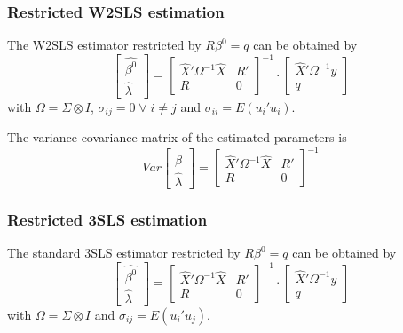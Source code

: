 \documentclass[article]{jss}
\begin{document}
\subsubsection{Restricted W2SLS estimation}

The W2SLS estimator restricted by $R \beta^0 = q$ can be obtained by
\begin{equation}
   \left[ \begin{array}{c}
      \widehat{\beta^0} \\ \widehat{\lambda}
   \end{array} \right]
   =
   \left[ \begin{array}{cc}
      \widehat{X}' \Omega^{-1} \widehat{X} & R' \\ 
      R & 0
   \end{array} \right]^{-1}
   \cdot
   \left[ \begin{array}{c}
      \widehat{X}' \Omega^{-1} y \\ q 
   \end{array} \right]
\end{equation}
with $\Omega = \Sigma \otimes I$, 
$\sigma_{ij} = 0 \; \forall \; i \neq j$ and
$\sigma_{ii} = E \left( u_i' u_i \right)$.

The variance-covariance matrix of the estimated parameters is
\begin{equation}
   Var 
   \left[ \begin{array}{c}
      \widehat{\beta} \\ \widehat{\lambda}
   \end{array} \right] 
   = 
   \left[ \begin{array}{cc}
      \widehat{X}' \Omega^{-1} \widehat{X} & R' \\ 
      R & 0
   \end{array} \right]^{-1}
\end{equation}


\subsubsection{Restricted 3SLS estimation}

The standard 3SLS estimator restricted by $R \beta^0 = q$ can be obtained by
\begin{equation}
   \left[ \begin{array}{c}
      \widehat{\beta^0} \\ \widehat{\lambda}
   \end{array} \right]
   =
   \left[ \begin{array}{cc}
      \widehat{X}' \Omega^{-1} \widehat{X} & R' \\ 
      R & 0
   \end{array} \right]^{-1}
   \cdot
   \left[ \begin{array}{c}
      \widehat{X}' \Omega^{-1} y \\ q 
   \end{array} \right]
\end{equation}
with $\Omega = \Sigma \otimes I$ and
$\sigma_{ij} = E \left( u_i' u_j \right)$.
\end{document}
